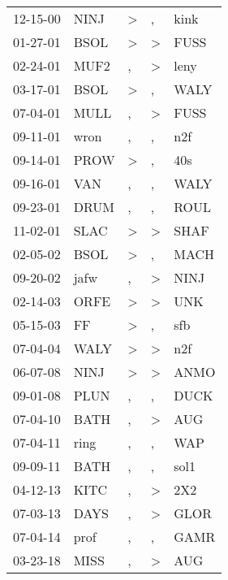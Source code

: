 \begin{supertabular}{lllll}
 12-15-00 &  NINJ &  \textgreater &             , &  kink \\
 01-27-01 &  BSOL &  \textgreater &  \textgreater &  FUSS \\
 02-24-01 &  MUF2 &             , &  \textgreater &  leny \\
 03-17-01 &  BSOL &  \textgreater &             , &  WALY \\
 07-04-01 &  MULL &             , &  \textgreater &  FUSS \\
 09-11-01 &  wron &             , &             , &   n2f \\
 09-14-01 &  PROW &  \textgreater &             , &   40s \\
 09-16-01 &   VAN &             , &             , &  WALY \\
 09-23-01 &  DRUM &             , &             , &  ROUL \\
 11-02-01 &  SLAC &  \textgreater &  \textgreater &  SHAF \\
 02-05-02 &  BSOL &  \textgreater &             , &  MACH \\
 09-20-02 &  jafw &             , &  \textgreater &  NINJ \\
 02-14-03 &  ORFE &  \textgreater &  \textgreater &   UNK \\
 05-15-03 &    FF &  \textgreater &             , &   sfb \\
 07-04-04 &  WALY &  \textgreater &  \textgreater &   n2f \\
 06-07-08 &  NINJ &  \textgreater &  \textgreater &  ANMO \\
 09-01-08 &  PLUN &             , &             , &  DUCK \\
 07-04-10 &  BATH &             , &  \textgreater &   AUG \\
 07-04-11 &  ring &             , &             , &   WAP \\
 09-09-11 &  BATH &             , &             , &  sol1 \\
 04-12-13 &  KITC &             , &  \textgreater &   2X2 \\
 07-03-13 &  DAYS &             , &  \textgreater &  GLOR \\
 07-04-14 &  prof &             , &             , &  GAMR \\
 03-23-18 &  MISS &             , &  \textgreater &   AUG \\
\end{supertabular}
